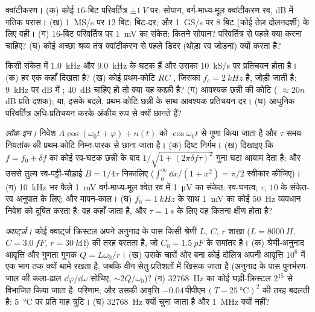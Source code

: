 \begin{exercise}[$\star\star$]\label{exo:b2:feedback-oscillators:8}
क्वांटीकरण। (क) कोई $16$-बिट परिवर्तित्र $\pm\qty{1}{V}$ पर: सोपान, वर्ग-माध्य-मूल
क्वांटीकरण रव, dB में गतिक परास। (ख) \qty{1}{MS/s} पर
$12$ बिट: बिट-दर; और \qty{1}{GS/s} पर $8$ बिट (कोई तेज़
दोलनदर्शी) के लिए वही। (ग) $16$-बिट परिवर्तित्र पर \qty{1}{mV} का संकेत: कितने
सोपान? परिवर्तित्र से पहले क्या करना चाहिए? (घ) कोई अच्छा श्रव्य
तंत्र क्वांटीकरण से पहले डिदर (थोड़ा रव जोड़ना) क्यों करता है?
\end{exercise}

\begin{exercise}[$\star\star$]\label{exo:b2:feedback-oscillators:9}
किसी संकेत में \qty{1.0}{kHz} और \qty{9.0}{kHz} के घटक हैं और उसका
\qty{10}{kS/s} पर प्रतिचयन होता है। (क) हर एक कहाँ दिखता है? (ख)
कोई प्रथम-कोटि $RC$ , जिसका $f_c = \qty{2}{kHz}$ है, जोड़ी जाती है:
\qty{9}{kHz} पर dB में ; \qty{40}{dB} चाहिए हो तो क्या यह काफ़ी है? (ग)
आवश्यक छन्नी की कोटि ( $\approx 20n$ dB प्रति दशक); या,
इसके बदले, प्रथम-कोटि छन्नी के साथ आवश्यक प्रतिचयन दर। (घ)
आधुनिक परिवर्तित्र अधि-प्रतिचयन करके अंकीय रूप से क्यों छानते हैं?
\end{exercise}

\begin{exercise}[$\star\star\star$]\label{exo:b2:feedback-oscillators:10}
\emph{लॉक-इन।} निवेश $A\cos(\omega_0t + \varphi) + n(t)$ को $\cos\omega_0t$ से गुणा किया
जाता है और $\tau$ समय-नियतांक की प्रथम-कोटि निम्न-पारक से छाना जाता है। (क) दिष्ट
निर्गम। (ख) दिखाइए कि $f = f_0 + \delta f$ का कोई रव-घटक छन्नी के बाद
$1/\sqrt{1 + (2\pi\delta f\tau)^2}$ गुना घटा आयाम देता है;
और उससे तुल्य रव-पट्टी-चौड़ाई $B = 1/4\tau$ निकालिए ($\int_0^\infty
\dd x/(1 + x^2) = \pi/2$ स्वीकार कीजिए)। (ग) \qty{10}{kHz} भर फैले \qty{1}{mV} वर्ग-माध्य-मूल
श्वेत रव में \qty{1}{\micro V} का संकेत: रव-घनत्व; $\tau$, $10$ के संकेत-रव
अनुपात के लिए; और मापन-काल। (घ) $f_0 = \qty{1}{kHz}$ के साथ \qty{1}{mV} का कोई
\qty{50}{Hz} व्यवधान निवेश को दूषित करता है: वह कहाँ जाता है, और
$\tau = \qty{1}{s}$ के लिए वह कितना क्षीण होता है?
\end{exercise}

\begin{exercise}[$\star\star\star$]\label{exo:b2:feedback-oscillators:11}
\emph{क्वार्ट्ज़।} कोई क्वार्ट्ज़ क्रिस्टल अपने अनुनाद के पास किसी
श्रेणी $L$, $C$, $r$ शाखा ($L = \qty{8000}{H}$, $C = \qty{3.0}{fF}$, $r =
\qty{30}{k\ohm}$) की तरह बरतता है, जो $C_0 = \qty{1.5}{pF}$ के समांतर है। (क) श्रेणी-अनुनाद
आवृत्ति और गुणता गुणक $Q = L\omega_0/r$। (ख) उसके चारों ओर बना कोई दोलित्र
अपनी आवृत्ति $10^6$ में एक भाग तक क्यों थामे रखता है, जबकि वीन
सेतु प्रतिशतों में खिसक जाता है (अनुनाद के पास पुनर्भरण-जाल की कला-ढाल
$\dd\varphi/\dd\omega$ सोचिए, $\sim 2Q/\omega_0$)? (ग) \qty{32768}{Hz} का कोई घड़ी-क्रिस्टल
$2^{15}$ से विभाजित किया जाता है: परिणाम; और उसकी आवृत्ति
$-0.04\,\text{पीपीएम}\,(T - \qty{25}{\degreeCelsius})^2$ की तरह बदलती है: \qty{5}{\degreeCelsius} पर
प्रति माह त्रुटि। (घ) \qty{32768}{Hz} क्यों चुना जाता है और
\qty{1}{MHz} क्यों नहीं?
\end{exercise}

